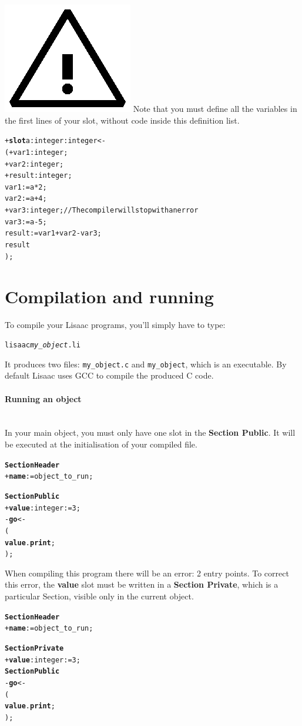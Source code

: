 \documentclass[11pt]{mybook}
\newcommand{\warning}{\includegraphics[scale=0.3]{figures/warning}}
\begin{document}
\warning{} Note that you must define all the variables in the first lines of your slot, without code inside this definition list.

\begin{alltt}
  + {\bf{}slot} a:{\sc{}integer} :{\sc{}integer}  <- 
  ( + var1:{\sc{}integer};
    + var2:{\sc{}integer};   
    + result:{\sc{}integer};
    var1 := a * 2;
    var2 := a + 4;
    + var3:{\sc{}integer};                    // The compiler will stop with an error
    var3 := a - 5;
    result := var1 + var2 - var3;
    result
  );
\end{alltt}

\section{Compilation and running}
\label{quickstart:compilation}
%
To compile your Lisaac programs, you'll simply have to type:

\begin{alltt}
  lisaac {\it{}my\_object}.li
\end{alltt}

It produces two files: {\tt my\_object.c} and {\tt my\_object}, which is an executable.
By default Lisaac uses GCC to compile the produced C code.

\paragraph{Running an object} 
~\\

In your main object, you must only have one slot in the {\bf{}Section Public}.
It will be executed at the initialisation of your compiled file.
\begin{alltt}
{\bf{}Section Header}
  + {\bf{}name}     := {\sc{}object\_to\_run};

{\bf{}Section Public}
  + {\bf{}value}:{\sc{}integer}  := 3;
  - {\bf{}go} <-                 
  (
    {\bf{}value}.{\bf{}print};
  );
\end{alltt}
When compiling this program there will be an error: 2 entry points.
To correct this error, the {\bf{}value} slot must be written in a {\bf{}Section Private}, which is a particular Section, visible only in the current object.
\begin{alltt}
{\bf{}Section Header}
  + {\bf{}name}     := {\sc{}object\_to\_run};

{\bf{}Section Private}
  + {\bf{}value}:{\sc{}integer}  := 3;
{\bf{}Section Public}
  - {\bf{}go} <-                 
  (
    {\bf{}value}.{\bf{}print};
  );
\end{alltt}
\end{document}
